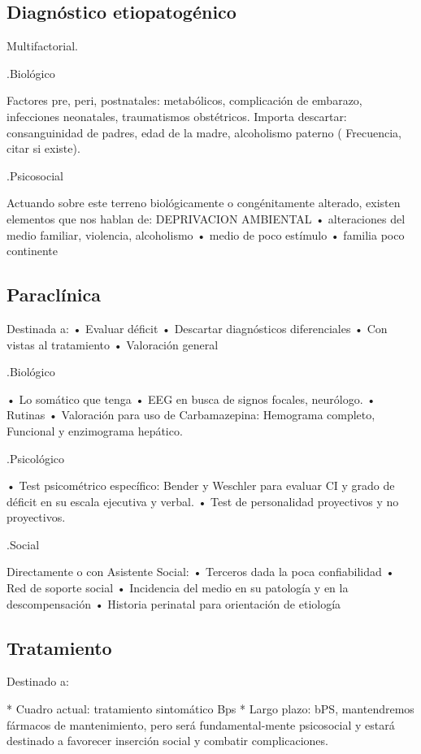 \subsection*{Diagnóstico etiopatogénico}
Multifactorial.

.Biológico

Factores pre, peri, postnatales: metabólicos, complicación de embarazo, infecciones neonatales, traumatismos obstétricos. Importa descartar: consanguinidad de padres, edad de la madre, alcoholismo paterno ( Frecuencia, citar si existe).

.Psicosocial

Actuando sobre este terreno biológicamente o congénitamente alterado, existen elementos que nos hablan de: DEPRIVACION AMBIENTAL • alteraciones del medio familiar, violencia, alcoholismo • medio de poco estímulo • familia poco continente

\subsection*{Paraclínica}

Destinada a: • Evaluar déficit • Descartar diagnósticos diferenciales • Con vistas al tratamiento • Valoración general

.Biológico

• Lo somático que tenga • EEG en busca de signos focales, neurólogo. • Rutinas • Valoración para uso de Carbamazepina: Hemograma completo, Funcional y enzimograma hepático.

.Psicológico

• Test psicométrico específico: Bender y Weschler para evaluar CI y grado de déficit en su escala ejecutiva y verbal. • Test de personalidad proyectivos y no proyectivos.

.Social

Directamente o con Asistente Social: • Terceros dada la poca confiabilidad • Red de soporte social • Incidencia del medio en su patología y en la descompensación • Historia perinatal para orientación de etiología

\subsection*{Tratamiento}

Destinado a:

* Cuadro actual: tratamiento sintomático Bps
* Largo plazo: bPS, mantendremos fármacos de mantenimiento, pero será fundamental-mente psicosocial y estará destinado a favorecer inserción social y combatir complicaciones.

